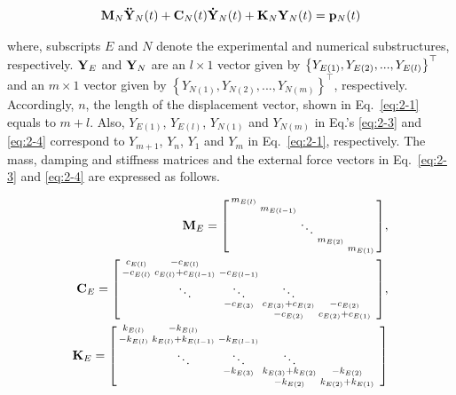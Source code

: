 \begin{equation}\label{eq:2-4}
\mathbf{M}_{N}\mathbf{\ddot{Y}}_{N}(t)+\mathbf{C}_{N}(t)\mathbf{\dot{Y}}_{N}(t)+\mathbf{K}_{N}\mathbf{Y}_{N}(t) = \mathbf{p}_{N}(t)
\end{equation}

where, subscripts $E$ and $N$ denote the experimental and numerical substructures, respectively. $\mathbf{Y}_{E}$ and $\mathbf{Y}_{N}$ are an $l \times 1$ vector given by $\bracr{Y_{E(1)},Y_{E(2)},...,Y_{E(l)}}^{\top}$ and an $m \times 1$ vector given by $\left\{Y_{N(1)},Y_{N(2)},...,Y_{N(m)}\right\}^{\top}$, respectively. Accordingly, $n$, the length of the displacement vector, shown in Eq.~\eqref{eq:2-1} equals to $m+l$. Also, $Y_{E(1)}$, $Y_{E(l)}$, $Y_{N(1)}$ and $Y_{N(m)}$ in Eq.'s \eqref{eq:2-3} and \eqref{eq:2-4} correspond to $Y_{m+1}$, $Y_{n}$, $Y_{1}$ and $Y_{m}$ in Eq.~\eqref{eq:2-1}, respectively. The mass, damping and stiffness matrices and the external force vectors in Eq.~\eqref{eq:2-3} and \eqref{eq:2-4} are expressed as follows.

\begin{equation}\label{eq:2-5}
\begin{aligned}
\mathbf{M}_{E} = \begin{bsmallmatrix} m_{E(l)}&&&&\\&m_{E(l-1)}&&&\\&&\ddots&&\\&&&m_{E(2)}&\\&&&&m_{E(1)} \end{bsmallmatrix},\\
\mathbf{C}_{E} = \begin{bsmallmatrix} c_{E(l)}&-c_{E(l)}&&&&\\-c_{E(l)}&c_{E(l)}+c_{E(l-1)}&-c_{E(l-1)}&&\\&\ddots&\ddots&\ddots&\\&&-c_{E(3)}&c_{E(3)}+c_{E(2)}&-c_{E(2)}\\&&&-c_{E(2)}&c_{E(2)}+c_{E(1)} \end{bsmallmatrix},\\
\mathbf{K}_{E} = \begin{bsmallmatrix} k_{E(l)}&-k_{E(l)}&&&&\\-k_{E(l)}&k_{E(l)}+k_{E(l-1)}&-k_{E(l-1)}&&\\&\ddots&\ddots&\ddots&\\&&-k_{E(3)}&k_{E(3)}+k_{E(2)}&-k_{E(2)}\\&&&-k_{E(2)}&k_{E(2)}+k_{E(1)} \end{bsmallmatrix}
\end{aligned}
\end{equation}

